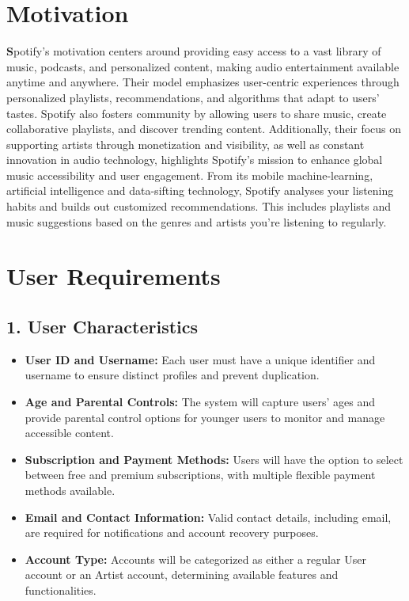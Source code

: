 \documentclass[a4paper,10pt]{article}
\begin{document}
\section{Motivation}
\textbf Spotify's motivation centers around providing easy access to a vast library of music, podcasts, and personalized content, making audio entertainment available anytime and anywhere. Their model emphasizes user-centric experiences through personalized playlists, recommendations, and algorithms that adapt to users’ tastes.
Spotify also fosters community by allowing users to share music, create collaborative playlists, and discover trending content. Additionally, their focus on supporting artists through monetization and visibility, as well as constant innovation in audio technology, highlights Spotify’s mission to enhance global music accessibility and user engagement.
From its mobile machine-learning, artificial intelligence and data-sifting technology, Spotify analyses your listening habits and builds out customized recommendations. This includes playlists and music suggestions based on the genres and artists you're listening to regularly.

\section{User Requirements}
\subsection{1. User Characteristics}
    \begin{itemize}[leftmargin=*]
        \item \textbf{User ID and Username:} Each user must have a unique identifier and username to ensure distinct profiles and prevent duplication.
        \item \textbf{Age and Parental Controls:} The system will capture users’ ages and provide parental control options for younger users to monitor and manage accessible content.
        \item \textbf{Subscription and Payment Methods:} Users will have the option to select between free and premium subscriptions, with multiple flexible payment methods available.
        \item \textbf{Email and Contact Information:} Valid contact details, including email, are required for notifications and account recovery purposes.
        \item \textbf{Account Type:} Accounts will be categorized as either a regular User account or an Artist account, determining available features and functionalities.
    \end{itemize}
\end{document}
